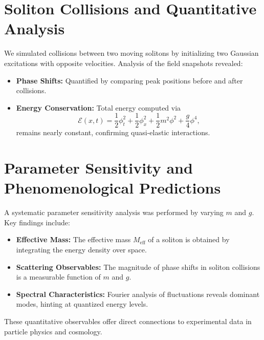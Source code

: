 \documentclass{article}
\begin{document}
\section{Soliton Collisions and Quantitative Analysis}
We simulated collisions between two moving solitons by initializing two Gaussian excitations with opposite velocities. Analysis of the field snapshots revealed:
\begin{itemize}
    \item \textbf{Phase Shifts:} Quantified by comparing peak positions before and after collisions.
    \item \textbf{Energy Conservation:} Total energy computed via
    \[
    \mathcal{E}(x,t)=\frac{1}{2}\phi_t^2+\frac{1}{2}\phi_x^2+\frac{1}{2}m^2\phi^2+\frac{g}{4}\phi^4,
    \]
    remains nearly constant, confirming quasi-elastic interactions.
\end{itemize}

\section{Parameter Sensitivity and Phenomenological Predictions}
A systematic parameter sensitivity analysis was performed by varying \(m\) and \(g\). Key findings include:
\begin{itemize}
    \item \textbf{Effective Mass:} The effective mass \(M_{\text{eff}}\) of a soliton is obtained by integrating the energy density over space.
    \item \textbf{Scattering Observables:} The magnitude of phase shifts in soliton collisions is a measurable function of \(m\) and \(g\).
    \item \textbf{Spectral Characteristics:} Fourier analysis of fluctuations reveals dominant modes, hinting at quantized energy levels.
\end{itemize}
These quantitative observables offer direct connections to experimental data in particle physics and cosmology.
\end{document}
